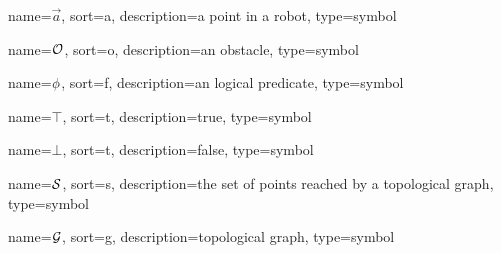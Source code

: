 	{%
		name=\ensuremath{\vec{a}},
		sort=a,
		description=a point in a robot,
		type=symbol
	}
	\newcommand{\pointinrobot}{\gls{sym:pointinrobot}}

	{%
		name=\ensuremath{\set{O}},
		sort=o,
		description=an obstacle,
		type=symbol
	}
	\newcommand{\obstacle}{\gls{sym:obstacle}}

	{%
		name=\ensuremath{\func{\phi}},
		sort=f,
		description=an logical predicate,
		type=symbol
	}
	\newcommand{\logicalpredicate}{\gls{sym:logicalpredicate}}

	{%
		name=\ensuremath{\top},
		sort=t,
		description=true,
		type=symbol
	}
	\newcommand{\true}{\gls{sym:true}}

	{%
		name=\ensuremath{\bot},
		sort=t,
		description=false,
		type=symbol
	}
	\newcommand{\false}{\gls{sym:false}}

	{%
		name=\ensuremath{\set{S}},
		sort=s,
		description=the set of points reached by a topological graph,
		type=symbol
	}
	\newcommand{\swath}{\gls{sym:swath}}

	{%
		name=\ensuremath{\set{G}},
		sort=g,
		description=topological graph,
		type=symbol
	}
	\newcommand{\topologicalgraph}{\gls{sym:topologicalgraph}}

